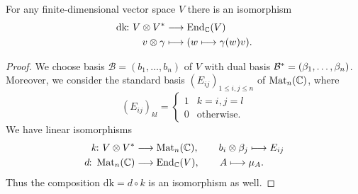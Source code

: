 \documentclass[a4paper, oneside, 12pt]{amsart}
\begin{document}
\begin{proposition}\label{prop:can-iso}
  For any finite-dimensional vector space \(V\) there is an isomorphism
  \begin{align*}
    \mathrm{dk} \from V\otimes \rd*{V} &\to \End_{ \mathbb{C}}(V)\\
    v \otimes \gamma  &\mapsto (w \mapsto \gamma(w)v).
  \end{align*}
\end{proposition}
\begin{proof}
  We choose basis \(\mathcal{B}=(b_{1}, \dots , b_{n})\) of \(V\) with dual basis \(\rd*{\mathcal{B}}= (\beta_{1}, \dots , \beta_{n})\).
  Moreover, we consider the standard basis \((E_{ij})_{1\leq i,j \leq n}\) of \(\operatorname{Mat}_{n}( \mathbb{C})\),
  where
  \begin{equation*}
    (E_{ij})_{kl}=
    \begin{cases}
      1 & k=i, j=l \\
      0 & \text{otherwise.}
    \end{cases}
  \end{equation*}
  We have linear isomorphisms
  \begin{align*}
    k\from  V\otimes \rd*{V} &\to \Mat_{n}( \mathbb{C}),\qquad  b_{i}\otimes \beta_{j}\mapsto E_{ij} \\
    d \from \Mat_{n}( \mathbb{C}) &\to \End_{ \mathbb{C}}(V), \qquad A \mapsto \mu_{A}.
  \end{align*}
  Thus the composition \(\mathrm{dk} = d\circ k\) is an isomorphism as well.
\end{proof}
\end{document}
